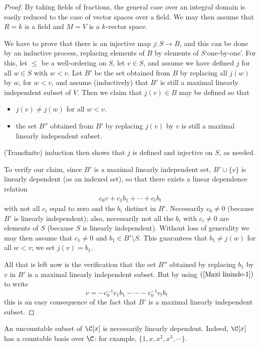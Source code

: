 \begin{proof}
By taking fields of fractions, the general case over an integral domain is easily reduced to the case of vector spaces over a field. We may then assume that $R=k$ is a field and $M=V$ is a $k$-vector space.\par
We have to prove that there is an injective map $j:S\to B$, and this can be done by an inductive process, replacing elements of $B$ by elements of $S$‘one-by-one’. For this, let $\leq$ be a well-ordering on $S$, let $v\in S$, and assume we have defined $j$ for all $w\in S$ with $w<v$. Let $B'$ be the set obtained from $B$ by replacing all $j(w)$ by $w$, for $w<v$, and assume (inductively) that $B'$ is still a maximal linearly independent subset of $V$. Then we claim that $j(v)\in B$ may be defined so that
\begin{itemize}
\item $j(v)\neq j(w)$ for all $w<v$.
\item the set $B''$ obtained from $B'$ by replacing $j(v)$ by $v$ is still a maximal linearly
independent subset.
\end{itemize}
(Transfinite) induction then shows that $j$ is defined and injective on $S$, as needed.\par
To verify our claim, since $B'$ is a maximal linearly independent set, $B'\cup\{v\}$ is linearly dependent (as an indexed set), so that there exists a linear dependence relation
\begin{align}\label{Maxi lininde-1}
c_0v+c_1b_1+\cdots+c_tb_t
\end{align}
with not all $c_i$ equal to zero and the $b_i$ distinct in $B'$. Necessarily $c_0\neq0$ (because
$B'$ is linearly independent); also, necessarily not all the $b_i$ with $c_i\neq0$ are elements
of $S$ (because $S$ is linearly independent). Without loss of generality we may then assume that $c_1\neq0$ and $b_1\in B'\setminus S$. This guarantees that $b_1\neq j(w)$ for all $w<v$; we set $j(v)=b_1$.\par
All that is left now is the verification that the set $B''$ obtained by replacing $b_1$ by $v$ in $B'$ is a maximal linearly independent subset. But by using $(\ref{Maxi lininde-1})$ to write
\[v=-c_0^{-1}c_1b_1-\cdots-c_0^{-1}c_tb_t\quad\]
this is an easy consequence of the fact that $B'$ is a maximal linearly independent subset.
\end{proof}
\begin{example}
An uncountable subset of $\C[x]$ is necessarily linearly dependent. Indeed, $\C[x]$ has a countable basis over $\C$: for example, $\{1,x,x^2,x^3,\cdots\}$.
\end{example}
